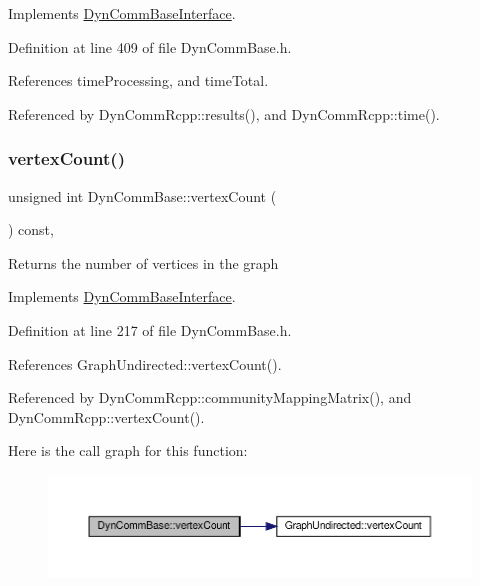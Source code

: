 Implements \hyperlink{classDynCommBaseInterface_a6fb483ffc71baf6f0d4f6a0371e34ca9}{Dyn\+Comm\+Base\+Interface}.



Definition at line 409 of file Dyn\+Comm\+Base.\+h.



References time\+Processing, and time\+Total.



Referenced by Dyn\+Comm\+Rcpp\+::results(), and Dyn\+Comm\+Rcpp\+::time().

\mbox{\label{classDynCommBase_ae415f1a7792158845f69d6850b762d87}} 
\subsubsection{\texorpdfstring{vertex\+Count()}{vertexCount()}}
{\footnotesize\ttfamily unsigned int Dyn\+Comm\+Base\+::vertex\+Count (\begin{DoxyParamCaption}{ }\end{DoxyParamCaption}) const\hspace{0.3cm}{\ttfamily [inline]}, {\ttfamily [virtual]}}

\begin{DoxyReturn}{Returns}
the number of vertices in the graph 
\end{DoxyReturn}


Implements \hyperlink{classDynCommBaseInterface_a792b9c74e55abbc48fbc078bc5fead0c}{Dyn\+Comm\+Base\+Interface}.



Definition at line 217 of file Dyn\+Comm\+Base.\+h.



References Graph\+Undirected\+::vertex\+Count().



Referenced by Dyn\+Comm\+Rcpp\+::community\+Mapping\+Matrix(), and Dyn\+Comm\+Rcpp\+::vertex\+Count().

Here is the call graph for this function\+:
\nopagebreak
\begin{figure}[H]
\begin{center}
\leavevmode
\includegraphics[width=350pt]{classDynCommBase_ae415f1a7792158845f69d6850b762d87_cgraph}
\end{center}
\end{figure}
\mbox{\label{classDynCommBase_ae240fba572935f26a72f73e39e115169}} 
